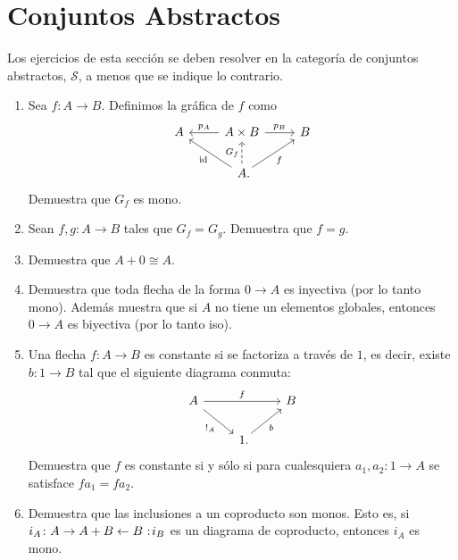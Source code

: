 \documentclass[11pt]{article}
\newcommand{\id}{\mathrm{id}}
\newcommand{\topos}[1]{\mathscr{#1}}
\newcommand{\noloc}{%
  \nobreak
  \mspace{6mu plus 1mu}
  {:}
  \nonscript\mkern-\thinmuskip
  \mathpunct{}
  \mspace{2mu}
}
\begin{document}
  \section*{Conjuntos Abstractos}
  Los ejercicios de esta sección se deben resolver en la categoría de conjuntos
  abstractos, \(\topos{S}\), a menos que se indique lo contrario.
  \begin{enumerate}[\bf\text{Ej.} 1.]
    \item Sea \(f\colon A\to B\). Definimos la gráfica de \(f\) como
      \begin{equation*}
        \begin{tikzcd}
          A & A\times B\ar{l}[swap]{p_A}\ar{r}{p_B} & B\\
          & A\mathrlap{.}\ar{ul}{\id}\ar{ur}[swap]{f}\ar[dashed]{u}{G_f}
        \end{tikzcd}
      \end{equation*}
      Demuestra que \(G_f\) es mono.

    \item Sean \(f,g\colon A\to B\) tales que \(G_f=G_g\). Demuestra que \(f=g\).
    
    \item Demuestra que \(A+0\cong A\).
    
    \item Demuestra que toda flecha de la forma \(0\to A\) es inyectiva (por lo
    tanto mono). Además muestra que si \(A\) no tiene un elementos globales, entonces
    \(0\to A\) es biyectiva (por lo tanto iso).
    
    \item Una flecha \(f\colon A\to B\) es constante si se factoriza a través de
    \(1\), es decir, existe \(b\colon 1\to B\) tal que el siguiente diagrama
    conmuta:
    \begin{equation*}
      \begin{tikzcd}
        A\ar{rr}{f}\ar{dr}[swap]{!_A} && B\\
        & 1\mathrlap{.}\ar{ur}[swap]{b}
      \end{tikzcd}
    \end{equation*}
    Demuestra que \(f\) es constante si y sólo si para cualesquiera 
    \(a_1,a_2\colon 1\to A\) se satisface \(fa_1 = fa_2\).

    \item Demuestra que las inclusiones a un coproducto son monos. Esto es, si 
    \(i_A\colon A\to A+B\leftarrow B\noloc i_B\) es un diagrama de coproducto,
    entonces \(i_A\) es mono.


\end{enumerate}
\end{document}
